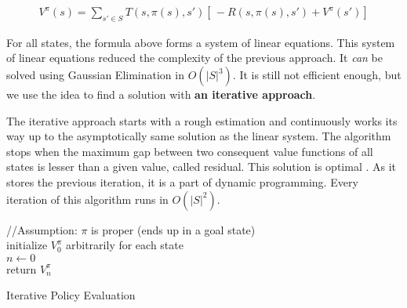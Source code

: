 \begin{equation}
\begin{aligned}
V^{\pi} (s) = \sum_{s' \in S} T(s, \pi (s), s') [ \,-R(s, \pi(s), s') + V^{\pi} (s')]
\end{aligned}
\end{equation}



For all states, the formula above forms a system of linear equations. This system of linear equations reduced the complexity of the previous approach. It \textit{can} be solved using Gaussian Elimination in $O(|S|^3)$. It is still not efficient enough, but we use the idea to find a solution with \textbf{an iterative approach}.

The iterative approach starts with a rough estimation and continuously works its way up to the asymptotically same solution as the linear system. The algorithm stops when the maximum gap between two consequent value functions of all states is lesser than a given value, called residual. This solution is optimal \cite{Kolobov2012}. As it stores the previous iteration, it is a part of dynamic programming. Every iteration of this algorithm runs in $O(|S|^2)$.

\LinesNumbered
\begin{algorithm}[ht]
\SetAlgoLined
//Assumption: $\pi$ is proper (ends up in a goal state) \\
initialize $V^{\pi}_0$ arbitrarily for each state \\
$n \xleftarrow{} 0$ \\
return $V^{\pi}_n$
\caption{Iterative Policy Evaluation}
\end{algorithm}

